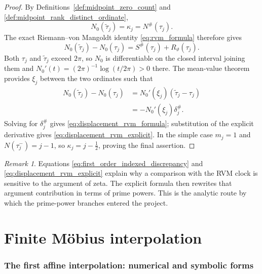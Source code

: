 \documentclass[11pt]{amsart}
\numberwithin{equation}{section}
\theoremstyle{plain}
\theoremstyle{definition}
\theoremstyle{remark}
\newtheorem{remark}[theorem]{Remark}
\newcommand{\1}{\mathbf{1}}
\begin{document}
\begin{proof}
By Definitions~\ref{def:midpoint_zero_count} and
\ref{def:midpoint_rank_distinct_ordinate},
\begin{equation}
N_0(\widetilde\tau_j)
=
\kappa_j
=
N^{\#}(\tau_j).
\label{eq:displacement_count_equalities}
\end{equation}
The exact Riemann--von Mangoldt identity
\eqref{eq:rvm_formula} therefore gives
\begin{equation}
N_0(\widetilde\tau_j)-N_0(\tau_j)
=
S^{\#}(\tau_j)+R_\vartheta(\tau_j).
\label{eq:displacement_count_difference}
\end{equation}
Both \(\tau_j\) and \(\widetilde\tau_j\) exceed \(2\pi\), so \(N_0\) is
differentiable on the closed interval joining them and
\(N_0'(t)=(2\pi)^{-1}\log(t/2\pi)>0\) there.  The mean-value theorem
provides \(\xi_j\) between the two ordinates such that
\begin{align}
N_0(\widetilde\tau_j)-N_0(\tau_j)
&=
N_0'(\xi_j)(\widetilde\tau_j-\tau_j)
\label{eq:displacement_mvt_first}
\\
&=
-N_0'(\xi_j)\delta_j^{\#}.
\label{eq:displacement_mvt}
\end{align}
Solving for \(\delta_j^{\#}\) gives
\eqref{eq:displacement_rvm_formula}; substitution of the explicit
derivative gives \eqref{eq:displacement_rvm_explicit}.  In the simple
case \(m_j=1\) and \(N(\tau_j^-)=j-1\), so
\(\kappa_j=j-\tfrac12\), proving the final assertion.
\end{proof}

\begin{remark}
\label{rem:rvm_origin_prime_formula}
Equations \eqref{eq:first_order_indexed_discrepancy} and
\eqref{eq:displacement_rvm_explicit} explain why a comparison with the RVM
clock is sensitive to the argument of zeta.  The explicit formula then
rewrites that argument contribution in terms of prime powers.  This is the
analytic route by which the prime-power branches entered the project.
\end{remark}

\part{Finite Möbius interpolation}


\section{The first affine interpolation: numerical and symbolic forms}
\label{sec:first_affine_interpolation}
\end{document}
